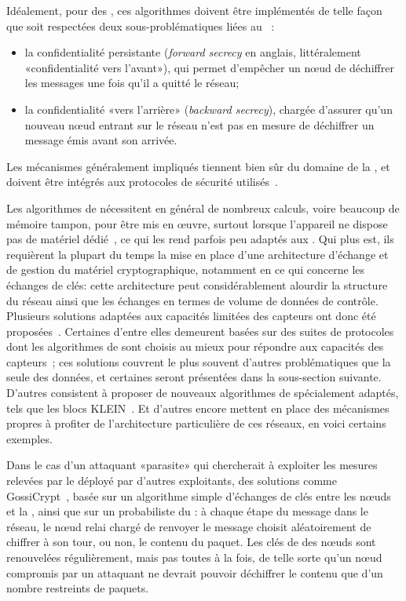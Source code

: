 Idéalement, pour des \rcs, ces algorithmes doivent être implémentés de telle façon que soit respectées deux sous-problématiques liées au ~\cite{LG08}:
\begin{itemize}
    \item la confidentialité persistante (\textit{forward secrecy} en anglais, littéralement «confidentialité vers l'avant»), qui permet d'empêcher un nœud de déchiffrer les messages une fois qu'il a quitté le réseau;
    \item la confidentialité «vers l'arrière» (\textit{backward secrecy}), chargée d'assurer qu'un nouveau nœud entrant sur le réseau n'est pas en mesure de déchiffrer un message émis avant son arrivée.
\end{itemize}
Les mécanismes généralement impliqués tiennent bien sûr du domaine de la , et doivent être intégrés aux protocoles de sécurité utilisés~\cite{DSK10}.

Les algorithmes de  nécessitent en général de nombreux calculs, voire beaucoup de mémoire tampon, pour être mis en œuvre, surtout lorsque l'appareil ne dispose pas de matériel dédié~\cite{PLP06}, ce qui les rend parfois peu adaptés aux \rcs.
Qui plus est, ils requièrent la plupart du temps la mise en place d'une architecture d'échange et de gestion du matériel cryptographique, notamment en ce qui concerne les échanges de clés: cette architecture peut considérablement alourdir la structure du réseau ainsi que les échanges en termes de volume de données de contrôle.
Plusieurs solutions adaptées aux capacités limitées des capteurs ont donc été proposées~\cite{OX09}.
Certaines d'entre elles demeurent basées sur des suites de protocoles dont les algorithmes de  sont choisis au mieux pour répondre aux capacités des capteurs~\cite{SOBMCN11,KR12}; ces solutions couvrent le plus souvent d'autres problématiques que la seule  des données, et certaines seront présentées dans la sous-section suivante.
D'autres consistent à proposer de nouveaux algorithmes de  spécialement adaptés, tels que les blocs KLEIN~\cite{GNL12}.
Et d'autres encore mettent en place des mécanismes propres à profiter de l'architecture particulière de ces réseaux, en voici certains exemples.

Dans le cas d'un attaquant «parasite» qui chercherait à exploiter les mesures relevées par le \rc déployé par d'autres exploitants, des solutions comme GossiCrypt~\cite{LPH08}, basée sur un algorithme simple d'échanges de clés entre les nœuds et la \sdb, ainsi que sur un  probabiliste du : à chaque étape du message dans le réseau, le nœud relai chargé de renvoyer le message choisit aléatoirement de chiffrer à son tour, ou non, le contenu du paquet.
Les clés de  des nœuds sont renouvelées régulièrement, mais pas toutes à la fois, de telle sorte qu'un nœud compromis par un attaquant ne devrait pouvoir déchiffrer le contenu que d'un nombre restreints de paquets.

